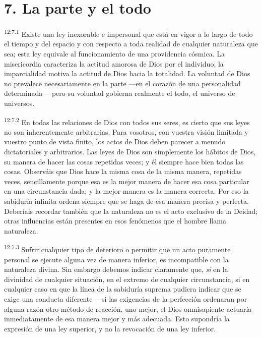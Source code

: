 \section*{7. La parte y el todo}
\par
\textsuperscript{12:7.1} Existe una ley inexorable e impersonal que está en vigor a lo largo de todo el tiempo y del espacio y con respecto a toda realidad de cualquier naturaleza que sea; esta ley equivale al funcionamiento de una providencia cósmica. La misericordia caracteriza la actitud amorosa de Dios por el individuo; la imparcialidad motiva la actitud de Dios hacia la totalidad. La voluntad de Dios no prevalece necesariamente en la parte ---en el corazón de una personalidad determinada--- pero su voluntad gobierna realmente el todo, el universo de universos.

\par
\textsuperscript{12:7.2} En todas las relaciones de Dios con todos sus seres, es cierto que sus leyes no son inherentemente arbitrarias. Para vosotros, con vuestra visión limitada y vuestro punto de vista finito, los actos de Dios deben parecer a menudo dictatoriales y arbitrarios. Las leyes de Dios son simplemente los hábitos de Dios, su manera de hacer las cosas repetidas veces; y él siempre hace bien todas las cosas. Observáis que Dios hace la misma cosa de la misma manera, repetidas veces, sencillamente porque esa es la mejor manera de hacer esa cosa particular en una circunstancia dada; y la mejor manera es la manera correcta. Por eso la sabiduría infinita ordena siempre que se haga de esa manera precisa y perfecta. Deberíais recordar también que la naturaleza no es el acto exclusivo de la Deidad; otras influencias están presentes en esos fenómenos que el hombre llama naturaleza.

\par
\textsuperscript{12:7.3} Sufrir cualquier tipo de deterioro o permitir que un acto puramente personal se ejecute alguna vez de manera inferior, es incompatible con la naturaleza divina. Sin embargo debemos indicar claramente que, \textit{si} en la divinidad de cualquier situación, en el extremo de cualquier circunstancia, si en cualquier caso en que la línea de la sabiduría suprema pudiera indicar que se exige una conducta diferente ---si las exigencias de la perfección ordenaran por alguna razón otro método de reacción, uno mejor, el Dios omnisapiente actuaría inmediatamente de esa manera mejor y más adecuada. Esto supondría la expresión de una ley superior, y no la revocación de una ley inferior.

